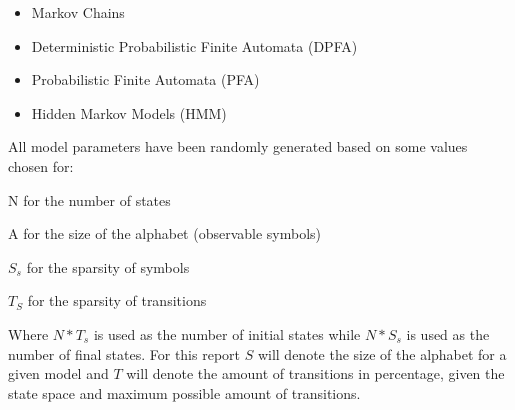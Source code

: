 \begin{itemize}
\item Markov Chains
\item Deterministic Probabilistic Finite Automata (DPFA)
\item Probabilistic Finite Automata (PFA)
\item Hidden Markov Models (HMM)
\end{itemize}
All model parameters have been randomly generated based on some values chosen for:
\begin{description}
\item N for the number of states
\item A for the size of the alphabet (observable symbols)
\item $S_s$ for the sparsity of symbols
\item $T_S$ for the sparsity of transitions
\end{description}
Where $N * T_s$ is used as the number of initial states while $N * S_s$ is used as the number of final states. For this report $S$ will denote the size of the alphabet for a given model and $T$ will denote the amount of transitions in percentage, given the state space and maximum possible amount of transitions.
